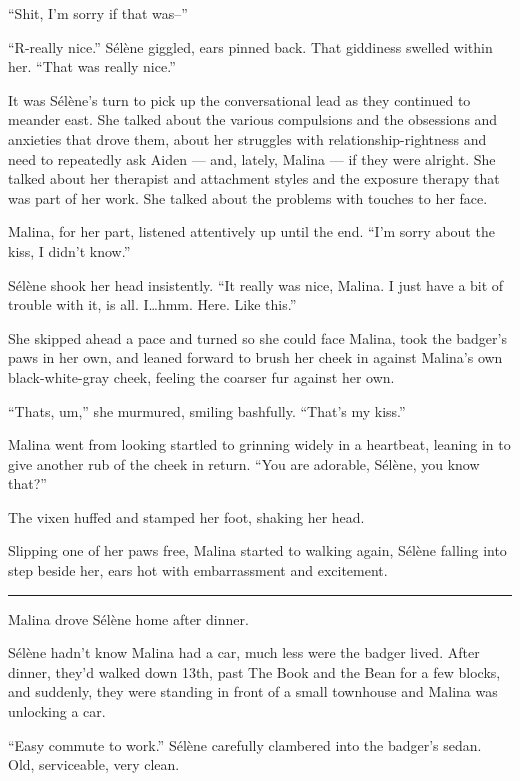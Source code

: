 ``Shit, I'm sorry if that was--''

``R-really nice.'' Sélène giggled, ears pinned back. That giddiness swelled within her. ``That was really nice.''

It was Sélène's turn to pick up the conversational lead as they continued to meander east. She talked about the various compulsions and the obsessions and anxieties that drove them, about her struggles with relationship-rightness and need to repeatedly ask Aiden --- and, lately, Malina --- if they were alright. She talked about her therapist and attachment styles and the exposure therapy that was part of her work. She talked about the problems with touches to her face.

Malina, for her part, listened attentively up until the end. ``I'm sorry about the kiss, I didn't know.''

Sélène shook her head insistently. ``It really was nice, Malina. I just have a bit of trouble with it, is all. I\ldots{}hmm. Here. Like this.''

She skipped ahead a pace and turned so she could face Malina, took the badger's paws in her own, and leaned forward to brush her cheek in against Malina's own black-white-gray cheek, feeling the coarser fur against her own.

``Thats, um,'' she murmured, smiling bashfully. ``That's my kiss.''

Malina went from looking startled to grinning widely in a heartbeat, leaning in to give another rub of the cheek in return. ``You are adorable, Sélène, you know that?''

The vixen huffed and stamped her foot, shaking her head.

Slipping one of her paws free, Malina started to walking again, Sélène falling into step beside her, ears hot with embarrassment and excitement.

\begin{center}\rule{0.5\linewidth}{\linethickness}\end{center}

Malina drove Sélène home after dinner.

Sélène hadn't know Malina had a car, much less were the badger lived. After dinner, they'd walked down 13th, past The Book and the Bean for a few blocks, and suddenly, they were standing in front of a small townhouse and Malina was unlocking a car.

``Easy commute to work.'' Sélène carefully clambered into the badger's sedan. Old, serviceable, very clean.


